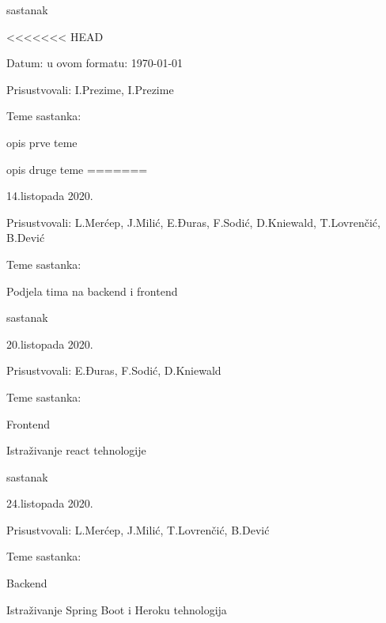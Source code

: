 \begin{packed_enum}
\begin{packed_item}
			\item  sastanak
			\item[] \begin{packed_item}
<<<<<<< HEAD
				\item Datum: u ovom formatu: \today
				\item Prisustvovali: I.Prezime, I.Prezime
				\item Teme sastanka:
				\begin{packed_item}
					\item  opis prve teme
					\item  opis druge teme
=======
				\item 14.listopada 2020.
				\item Prisustvovali: L.Merćep, J.Milić, E.Đuras, F.Sodić, D.Kniewald, T.Lovrenčić, B.Dević
				\item Teme sastanka:
				\begin{packed_item}
					\item  Podjela tima na backend i frontend
				\end{packed_item}
			\end{packed_item}
			
			\item  sastanak
			\item[] \begin{packed_item}
				\item 20.listopada 2020.
				\item Prisustvovali: E.Đuras, F.Sodić, D.Kniewald
				\item Teme sastanka:
				\begin{packed_item}
					\item  Frontend
					\item  Istraživanje react tehnologije
				\end{packed_item}
			\end{packed_item}
			
			\item  sastanak
			\item[] \begin{packed_item}
				\item 24.listopada 2020.
				\item Prisustvovali: L.Merćep, J.Milić, T.Lovrenčić, B.Dević
				\item Teme sastanka:
				\begin{packed_item}
					\item  Backend
					\item  Istraživanje Spring Boot i Heroku tehnologija
				\end{packed_item}
			\end{packed_item}
			

\end{packed_item}
\end{packed_item}
\end{packed_enum}
